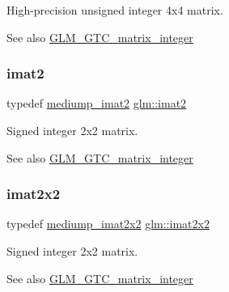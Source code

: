 High-\/precision unsigned integer 4x4 matrix. \begin{DoxySeeAlso}{See also}
\hyperlink{group__gtc__matrix__integer}{G\+L\+M\+\_\+\+G\+T\+C\+\_\+matrix\+\_\+integer} 
\end{DoxySeeAlso}
\mbox{\label{group__gtc__matrix__integer_ga77a581b3366fb63fc72f8f20830003e0}} 
\subsubsection{\texorpdfstring{imat2}{imat2}}
{\footnotesize\ttfamily typedef \hyperlink{group__gtc__matrix__integer_gae812330b83568359273b6ec96b002863}{mediump\+\_\+imat2} \hyperlink{group__gtc__matrix__integer_ga77a581b3366fb63fc72f8f20830003e0}{glm\+::imat2}}

Signed integer 2x2 matrix. \begin{DoxySeeAlso}{See also}
\hyperlink{group__gtc__matrix__integer}{G\+L\+M\+\_\+\+G\+T\+C\+\_\+matrix\+\_\+integer} 
\end{DoxySeeAlso}
\mbox{\label{group__gtc__matrix__integer_gaf7f44f44d966377666d41ed059524732}} 
\subsubsection{\texorpdfstring{imat2x2}{imat2x2}}
{\footnotesize\ttfamily typedef \hyperlink{group__gtc__matrix__integer_ga52a40f2f95562746fd8084726a300963}{mediump\+\_\+imat2x2} \hyperlink{group__gtc__matrix__integer_gaf7f44f44d966377666d41ed059524732}{glm\+::imat2x2}}

Signed integer 2x2 matrix. \begin{DoxySeeAlso}{See also}
\hyperlink{group__gtc__matrix__integer}{G\+L\+M\+\_\+\+G\+T\+C\+\_\+matrix\+\_\+integer} 
\end{DoxySeeAlso}
\mbox{\label{group__gtc__matrix__integer_ga143bc5177bac9991d84b70da03952516}} 
